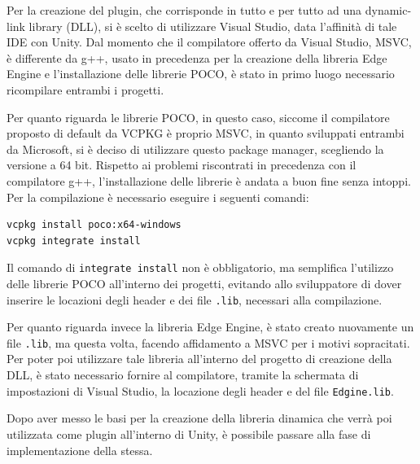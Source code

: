 Per la creazione del plugin, che corrisponde in tutto e per tutto ad una dynamic-link library (DLL), si è scelto di utilizzare Visual Studio, data l'affinità di tale IDE con Unity. Dal momento che il compilatore offerto da Visual Studio, MSVC, è differente da g++, usato in precedenza per la creazione della libreria Edge Engine e l’installazione delle librerie POCO, è stato in primo luogo necessario ricompilare entrambi i progetti.

Per quanto riguarda le librerie POCO, in questo caso, siccome il compilatore proposto di default da VCPKG è proprio MSVC, in quanto sviluppati entrambi da Microsoft, si è deciso di utilizzare questo package manager, scegliendo la versione a 64 bit. Rispetto ai problemi riscontrati in precedenza con il compilatore g++, l’installazione delle librerie è andata a buon fine senza intoppi. Per la compilazione è necessario eseguire i seguenti comandi:

\begin{verbatim}
vcpkg install poco:x64-windows
vcpkg integrate install
\end{verbatim}

Il comando di \texttt{integrate install} non è obbligatorio, ma semplifica l'utilizzo delle librerie POCO all'interno dei progetti, evitando allo sviluppatore di dover inserire le locazioni degli header e dei file \texttt{.lib}, necessari alla compilazione.

Per quanto riguarda invece la libreria Edge Engine, è stato creato nuovamente un file \texttt{.lib}, ma questa volta, facendo affidamento a MSVC per i motivi sopracitati. Per poter poi utilizzare tale libreria all'interno del progetto di creazione della DLL, è stato necessario fornire al compilatore, tramite la schermata di impostazioni di Visual Studio, la locazione degli header e del file \texttt{Edgine.lib}.

Dopo aver messo le basi per la creazione della libreria dinamica che verrà poi utilizzata come plugin all'interno di Unity, è possibile passare alla fase di implementazione della stessa.

